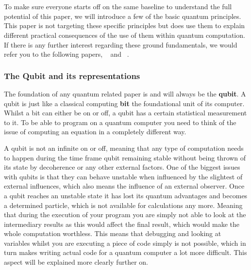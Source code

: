 \chapter{}
\label{ch:quantum-essentials}

To make sure everyone starts off on the same baseline to understand the full potential of this paper, we will introduce a few of the basic quantum principles. This paper is not targeting these specific principles but does use them to explain different practical consequences of the use of them within quantum computation. If there is any further interest regarding these ground fundamentals, we would refer you to the following papers, ~\textcite{Rieffel1998} and ~\textcite{Shor2000}.

\subsection{The Qubit and its representations}

The foundation of any quantum related paper is and will always be the \textbf{qubit}. A qubit is just like a classical computing \textbf{bit} the foundational unit of its computer. Whilst a bit can either be on or off, a qubit has a certain statistical measurement to it. To be able to program on a quantum computer you need to think of the issue of computing an equation in a completely different way.

A qubit is not an infinite on or off, meaning that any type of computation needs to happen during the time frame qubit remaining stable without being thrown of its state by decoherence or any other external factors. 
One of the biggest issues with qubits is that they can behave unstable when influenced by the slightest of external influences, which also means the influence of an external observer. Once a qubit reaches an unstable state it has lost its quantum advantages and becomes a determined particle, which is not available for calculations any more. Meaning that during the execution of your program you are simply not able to look at the intermediary results as this would affect the final result, which would make the whole computation worthless. This means that debugging and looking at variables whilst you are executing a piece of code simply is not possible, which in turn makes writing actual code for a quantum computer a lot more difficult. This aspect will be explained more clearly further on.

